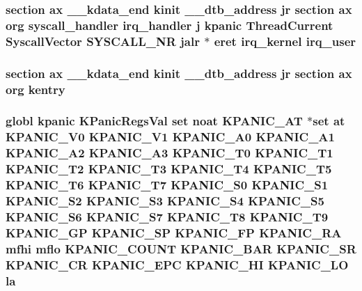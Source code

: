 \hypertarget{mips_2entry_8S_a50e17158d795021fb36a813c89b7a645}{
\subsubsection[{irq\-\_\-user}]{\setlength{\rightskip}{0pt plus 5cm}section ax {\bf \-\_\-\-\_\-kdata\-\_\-end} {\bf kinit} \-\_\-\-\_\-dtb\-\_\-address jr section ax org {\bf syscall\-\_\-handler} {\bf irq\-\_\-handler} j {\bf kpanic} {\bf Thread\-Current} {\bf Syscall\-Vector} {\bf S\-Y\-S\-C\-A\-L\-L\-\_\-\-N\-R} jalr $\ast$ eret {\bf irq\-\_\-kernel} irq\-\_\-user}}\label{mips_2entry_8S_a50e17158d795021fb36a813c89b7a645}
\hypertarget{mips_2entry_8S_a7f1cfe80f85e2f1bd9103b0960e09009}{
\subsubsection[{kentry}]{\setlength{\rightskip}{0pt plus 5cm}section ax {\bf \-\_\-\-\_\-kdata\-\_\-end} {\bf kinit} \-\_\-\-\_\-dtb\-\_\-address jr section ax org kentry}}\label{mips_2entry_8S_a7f1cfe80f85e2f1bd9103b0960e09009}
\hypertarget{mips_2entry_8S_a834b90b9918d03bb7f429b845f72164a}{
\subsubsection[{la}]{\setlength{\rightskip}{0pt plus 5cm}globl {\bf kpanic} {\bf K\-Panic\-Regs\-Val} set noat {\bf K\-P\-A\-N\-I\-C\-\_\-\-A\-T} $\ast$set at {\bf K\-P\-A\-N\-I\-C\-\_\-\-V0} {\bf K\-P\-A\-N\-I\-C\-\_\-\-V1} {\bf K\-P\-A\-N\-I\-C\-\_\-\-A0} {\bf K\-P\-A\-N\-I\-C\-\_\-\-A1} {\bf K\-P\-A\-N\-I\-C\-\_\-\-A2} {\bf K\-P\-A\-N\-I\-C\-\_\-\-A3} {\bf K\-P\-A\-N\-I\-C\-\_\-\-T0} {\bf K\-P\-A\-N\-I\-C\-\_\-\-T1} {\bf K\-P\-A\-N\-I\-C\-\_\-\-T2} {\bf K\-P\-A\-N\-I\-C\-\_\-\-T3} {\bf K\-P\-A\-N\-I\-C\-\_\-\-T4} {\bf K\-P\-A\-N\-I\-C\-\_\-\-T5} {\bf K\-P\-A\-N\-I\-C\-\_\-\-T6} {\bf K\-P\-A\-N\-I\-C\-\_\-\-T7} {\bf K\-P\-A\-N\-I\-C\-\_\-\-S0} {\bf K\-P\-A\-N\-I\-C\-\_\-\-S1} {\bf K\-P\-A\-N\-I\-C\-\_\-\-S2} {\bf K\-P\-A\-N\-I\-C\-\_\-\-S3} {\bf K\-P\-A\-N\-I\-C\-\_\-\-S4} {\bf K\-P\-A\-N\-I\-C\-\_\-\-S5} {\bf K\-P\-A\-N\-I\-C\-\_\-\-S6} {\bf K\-P\-A\-N\-I\-C\-\_\-\-S7} {\bf K\-P\-A\-N\-I\-C\-\_\-\-T8} {\bf K\-P\-A\-N\-I\-C\-\_\-\-T9} {\bf K\-P\-A\-N\-I\-C\-\_\-\-G\-P} {\bf K\-P\-A\-N\-I\-C\-\_\-\-S\-P} {\bf K\-P\-A\-N\-I\-C\-\_\-\-F\-P} {\bf K\-P\-A\-N\-I\-C\-\_\-\-R\-A} mfhi mflo {\bf K\-P\-A\-N\-I\-C\-\_\-\-C\-O\-U\-N\-T} {\bf K\-P\-A\-N\-I\-C\-\_\-\-B\-A\-R} {\bf K\-P\-A\-N\-I\-C\-\_\-\-S\-R} {\bf K\-P\-A\-N\-I\-C\-\_\-\-C\-R} {\bf K\-P\-A\-N\-I\-C\-\_\-\-E\-P\-C} {\bf K\-P\-A\-N\-I\-C\-\_\-\-H\-I} {\bf K\-P\-A\-N\-I\-C\-\_\-\-L\-O} la}}\label{mips_2entry_8S_a834b90b9918d03bb7f429b845f72164a}
